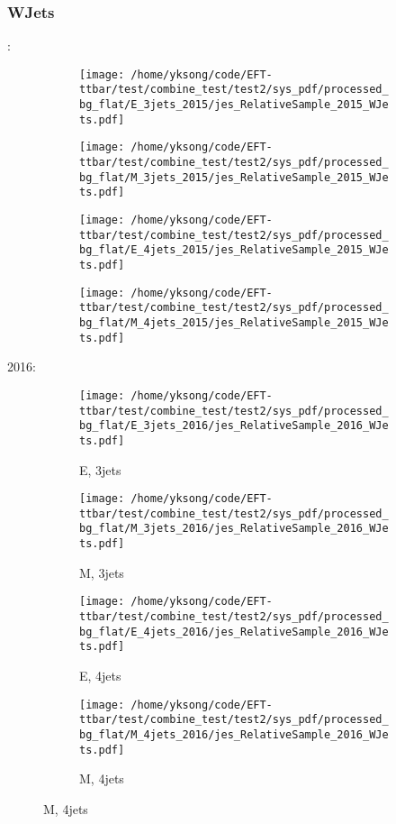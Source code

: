 \documentclass{beamer}
\begin{document}
\begin{frame}
\frametitle{WJets}
\fontsize{5}{1}:
\begin{figure}
\centering
\begin{subfigure}[b]{0.24\textwidth}
\texttt{[image: /home/yksong/code/EFT-ttbar/test/combine\_test/test2/sys\_pdf/processed\_bg\_flat/E\_3jets\_2015/jes\_RelativeSample\_2015\_WJets.pdf]}
\end{subfigure}
\begin{subfigure}[b]{0.24\textwidth}
\texttt{[image: /home/yksong/code/EFT-ttbar/test/combine\_test/test2/sys\_pdf/processed\_bg\_flat/M\_3jets\_2015/jes\_RelativeSample\_2015\_WJets.pdf]}
\end{subfigure}
\begin{subfigure}[b]{0.24\textwidth}
\texttt{[image: /home/yksong/code/EFT-ttbar/test/combine\_test/test2/sys\_pdf/processed\_bg\_flat/E\_4jets\_2015/jes\_RelativeSample\_2015\_WJets.pdf]}
\end{subfigure}
\begin{subfigure}[b]{0.24\textwidth}
\texttt{[image: /home/yksong/code/EFT-ttbar/test/combine\_test/test2/sys\_pdf/processed\_bg\_flat/M\_4jets\_2015/jes\_RelativeSample\_2015\_WJets.pdf]}
\end{subfigure}
\end{figure}
2016:
\begin{figure}
\centering
\begin{subfigure}[b]{0.24\textwidth}
\texttt{[image: /home/yksong/code/EFT-ttbar/test/combine\_test/test2/sys\_pdf/processed\_bg\_flat/E\_3jets\_2016/jes\_RelativeSample\_2016\_WJets.pdf]}
\captionsetup{font=tiny}
\caption{E, 3jets}
\end{subfigure}
\begin{subfigure}[b]{0.24\textwidth}
\texttt{[image: /home/yksong/code/EFT-ttbar/test/combine\_test/test2/sys\_pdf/processed\_bg\_flat/M\_3jets\_2016/jes\_RelativeSample\_2016\_WJets.pdf]}
\captionsetup{font=tiny}
\caption{M, 3jets}
\end{subfigure}
\begin{subfigure}[b]{0.24\textwidth}
\texttt{[image: /home/yksong/code/EFT-ttbar/test/combine\_test/test2/sys\_pdf/processed\_bg\_flat/E\_4jets\_2016/jes\_RelativeSample\_2016\_WJets.pdf]}
\captionsetup{font=tiny}
\caption{E, 4jets}
\end{subfigure}
\begin{subfigure}[b]{0.24\textwidth}
\texttt{[image: /home/yksong/code/EFT-ttbar/test/combine\_test/test2/sys\_pdf/processed\_bg\_flat/M\_4jets\_2016/jes\_RelativeSample\_2016\_WJets.pdf]}
\captionsetup{font=tiny}
\caption{M, 4jets}
\end{subfigure}
\end{figure}
\end{frame}
\end{document}
